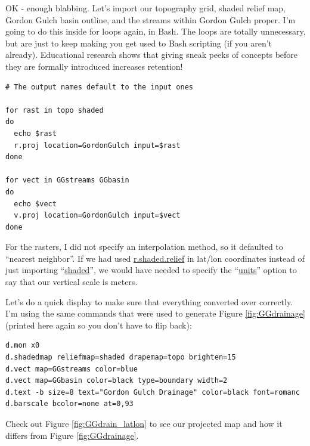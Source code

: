 \documentclass{book}
\begin{document}
OK - enough blabbing. Let's import our topography grid, shaded relief map, Gordon Gulch basin outline, and the streams within Gordon Gulch proper. I'm going to do this inside for loops again, in Bash. The loops are totally unnecessary, but are just to keep making you get used to Bash scripting (if you aren't already). Educational research shows that giving sneak peeks of concepts before they are formally introduced increases retention!
\begin{lstlisting}
# The output names default to the input ones

for rast in topo shaded
do
  echo $rast
  r.proj location=GordonGulch input=$rast
done

for vect in GGstreams GGbasin
do
  echo $vect
  v.proj location=GordonGulch input=$vect
done
\end{lstlisting}
For the rasters, I did not specify an interpolation method, so it defaulted to ``nearest neighbor''. If we had used \url{r.shaded.relief} in lat/lon coordinates instead of just importing ``\url{shaded}'', we would have needed to specify the ``\url{units}'' option to say that our vertical scale is meters.

Let's do a quick display to make sure that everything converted over correctly. I'm using the same commands that were used to generate Figure \ref{fig:GGdrainage} (printed here again so you don't have to flip back):
\begin{lstlisting}
d.mon x0
d.shadedmap reliefmap=shaded drapemap=topo brighten=15
d.vect map=GGstreams color=blue
d.vect map=GGbasin color=black type=boundary width=2
d.text -b size=8 text="Gordon Gulch Drainage" color=black font=romanc
d.barscale bcolor=none at=0,93
\end{lstlisting}
Check out Figure \ref{fig:GGdrain_latlon} to see our projected map and how it differs from Figure \ref{fig:GGdrainage}.
\end{document}
